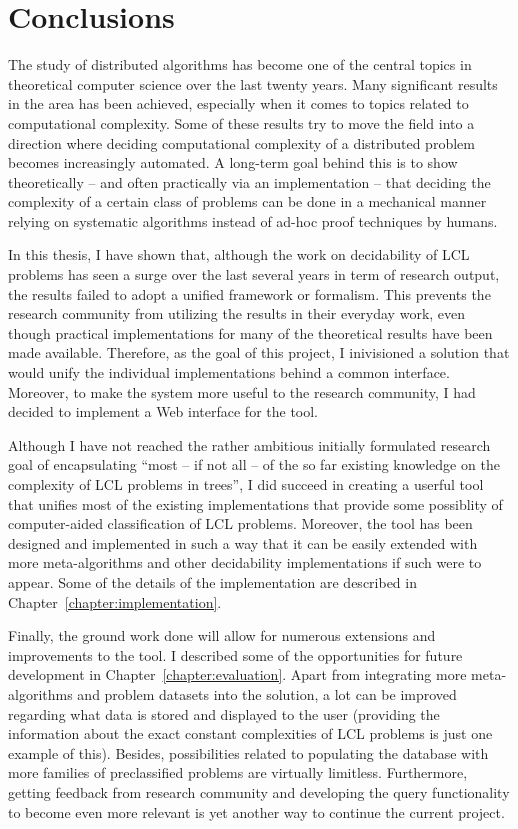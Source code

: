 \chapter{Conclusions}
\label{chapter:conclusions}

The study of distributed algorithms has become
one of the central topics in theoretical computer science
over the last twenty years. Many significant results in the area
has been achieved, especially when it comes to topics related
to computational complexity. Some of these results
try to move the field into a direction where deciding
computational complexity of a distributed problem becomes
increasingly automated. A long-term goal behind this is
to show theoretically -- and often practically via an
implementation -- that deciding the complexity of a certain class
of problems can be done in a mechanical manner relying
on systematic algorithms instead of ad-hoc proof techniques
by humans.

In this thesis, I have shown that, although the work on
decidability of LCL problems has seen a surge over the last
several years in term of research output, the results
failed to adopt a unified framework or formalism. This
prevents the research community from utilizing the
results in their everyday work, even though practical
implementations for many of the theoretical results have been
made available. Therefore, as the goal of this project, I
inivisioned a solution that would unify the individual
implementations behind a common interface. Moreover, to make
the system more useful to the research community, I had decided
to implement a Web interface for the tool.

Although I have not reached the rather ambitious initially formulated
research goal of encapsulating ``most -- if not
all -- of
the so far existing knowledge on the complexity of LCL
problems in trees'', I did succeed in creating a userful
tool that unifies most of the existing implementations that
provide some possiblity of computer-aided classification of LCL
problems. Moreover, the tool has been designed and implemented in
such a way that it can be easily extended with more meta-algorithms
and other decidability implementations if such were to appear.
Some of the details of the implementation are described
in Chapter~\ref{chapter:implementation}.

Finally, the ground work done will allow for numerous
extensions and improvements to the tool. I described
some of the opportunities for future development in
Chapter~\ref{chapter:evaluation}. Apart from
integrating more meta-algorithms and problem datasets into the
solution, a lot can be improved regarding what data
is stored and displayed to the user
(providing the information about the exact constant complexities of
LCL problems is just one example of this). Besides,
possibilities related to populating the database with more
families of preclassified problems are virtually limitless.
Furthermore, getting feedback from research community and
developing the query functionality to become even more
relevant is yet another way to continue the current
project.
